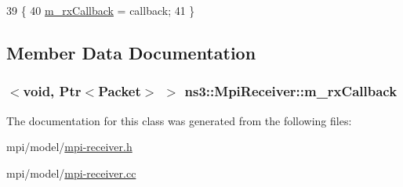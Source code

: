 \begin{DoxyCode}
39 \{
40   \hyperlink{classns3_1_1MpiReceiver_a03d6666dce90cf48f9fd5dff62fc6ca1}{m\_rxCallback} = callback;
41 \}
\end{DoxyCode}


\subsection{Member Data Documentation}
\subsubsection[{\texorpdfstring{m\+\_\+rx\+Callback}{m_rxCallback}}]{$<$void, {\bf Ptr}$<${\bf Packet}$>$ $>$ ns3\+::\+Mpi\+Receiver\+::m\+\_\+rx\+Callback\hspace{0.3cm}{\ttfamily [private]}}\hypertarget{classns3_1_1MpiReceiver_a03d6666dce90cf48f9fd5dff62fc6ca1}{}\label{classns3_1_1MpiReceiver_a03d6666dce90cf48f9fd5dff62fc6ca1}


The documentation for this class was generated from the following files\+:\begin{DoxyCompactItemize}
\item 
mpi/model/\hyperlink{mpi-receiver_8h}{mpi-\/receiver.\+h}\item 
mpi/model/\hyperlink{mpi-receiver_8cc}{mpi-\/receiver.\+cc}\end{DoxyCompactItemize}
